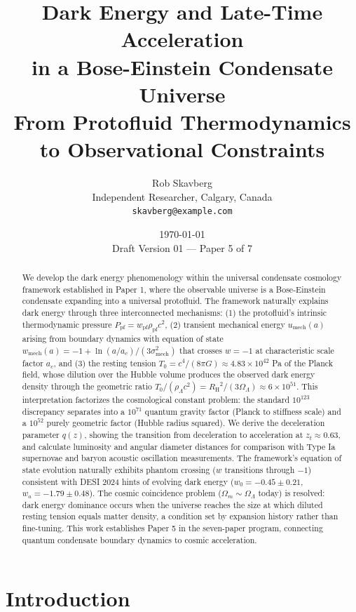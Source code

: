 \documentclass[11pt,a4paper]{article}
\title{\textbf{Dark Energy and Late-Time Acceleration\\in a Bose-Einstein Condensate Universe}\\[0.5em]
\large From Protofluid Thermodynamics to Observational Constraints}
\author{Rob Skavberg\\[0.3em]
\small Independent Researcher, Calgary, Canada\\
\small \texttt{skavberg@example.com}}
\date{\today\\[0.5em]
\small Draft Version 01 --- Paper 5 of 7}
\newcommand{\Tzero}{\ensuremath{T_0}}
\newcommand{\RH}{\ensuremath{R_{\mathrm{H}}}}
\newcommand{\umech}{\ensuremath{u_{\mathrm{mech}}}}
\newcommand{\wmech}{\ensuremath{w_{\mathrm{mech}}}}
\newcommand{\wpf}{\ensuremath{w_{\mathrm{pf}}}}
\newcommand{\Ppf}{\ensuremath{P_{\mathrm{pf}}}}
\newcommand{\rhopf}{\ensuremath{\rho_{\mathrm{pf}}}}
\newcommand{\OmegaLam}{\ensuremath{\Omega_\Lambda}}
\newcommand{\OmegaM}{\ensuremath{\Omega_m}}
\theoremstyle{definition}
\theoremstyle{remark}
\begin{document}
\maketitle

\begin{abstract}
We develop the dark energy phenomenology within the universal condensate cosmology framework established in Paper 1, where the observable universe is a Bose-Einstein condensate expanding into a universal protofluid. The framework naturally explains dark energy through three interconnected mechanisms: (1) the protofluid's intrinsic thermodynamic pressure $\Ppf = \wpf \rhopf c^2$, (2) transient mechanical energy $\umech(a)$ arising from boundary dynamics with equation of state $\wmech(a) = -1 + \ln(a/a_c)/(3\sigma_{\mathrm{mech}}^2)$ that crosses $w = -1$ at characteristic scale factor $a_c$, and (3) the resting tension $\Tzero = c^4/(8\pi G) \approx 4.83 \times 10^{42}$ Pa of the Planck field, whose dilution over the Hubble volume produces the observed dark energy density through the geometric ratio $\Tzero/(\rho_\Lambda c^2) = \RH^2/(3\OmegaLam) \approx 6 \times 10^{51}$. This interpretation factorizes the cosmological constant problem: the standard $10^{123}$ discrepancy separates into a $10^{71}$ quantum gravity factor (Planck to stiffness scale) and a $10^{52}$ purely geometric factor (Hubble radius squared). We derive the deceleration parameter $q(z)$, showing the transition from deceleration to acceleration at $z_t \approx 0.63$, and calculate luminosity and angular diameter distances for comparison with Type Ia supernovae and baryon acoustic oscillation measurements. The framework's equation of state evolution naturally exhibits phantom crossing ($w$ transitions through $-1$) consistent with DESI 2024 hints of evolving dark energy ($w_0 = -0.45 \pm 0.21$, $w_a = -1.79 \pm 0.48$). The cosmic coincidence problem ($\OmegaM \sim \OmegaLam$ today) is resolved: dark energy dominance occurs when the universe reaches the size at which diluted resting tension equals matter density, a condition set by expansion history rather than fine-tuning. This work establishes Paper 5 in the seven-paper program, connecting quantum condensate boundary dynamics to cosmic acceleration.
\end{abstract}

\tableofcontents
\newpage

\section{Introduction}
\label{sec:introduction}
\end{document}
